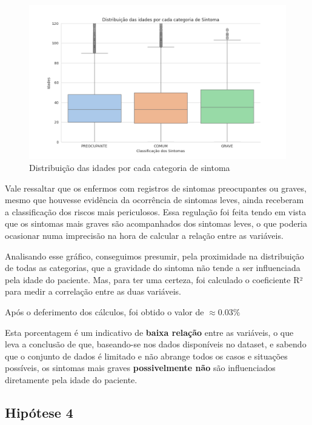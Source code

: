 \documentclass[a4paper, 12pt, twoside]{article}
\begin{document}
\begin{figure}[H]
    \centering
    \includegraphics[width=1.0\textwidth]{images/ages_per_symptom_classification.png}
    \caption{Distribuição das idades por cada categoria de sintoma}
    \label{fig:occupation}
\end{figure}

Vale ressaltar que os enfermos com registros de sintomas preocupantes ou graves, mesmo que houvesse evidência da ocorrência de sintomas leves, ainda receberam a classificação dos riscos mais periculosos. Essa regulação foi feita tendo em vista que os sintomas mais graves são acompanhados dos sintomas leves, o que poderia ocasionar numa imprecisão na hora de calcular a relação entre as variáveis.

Analisando esse gráfico, conseguimos presumir, pela proximidade na distribuição de todas as categorias, que a gravidade do sintoma não tende a ser influenciada pela idade do paciente. Mas, para ter uma certeza, foi calculado o coeficiente R² para medir a correlação entre as duas variáveis.

Após o deferimento dos cálculos, foi obtido o valor de \(\approx 0.03\%\)

Esta porcentagem é um indicativo de \textbf{baixa relação} entre as variáveis, o que leva a conclusão de que, baseando-se nos dados disponíveis no dataset, e sabendo que o conjunto de dados é limitado e não abrange todos os casos e situações possíveis, os sintomas mais graves \textbf{possivelmente não} são influenciados diretamente pela idade do paciente. 

\subsection{Hipótese 4}
\end{document}
